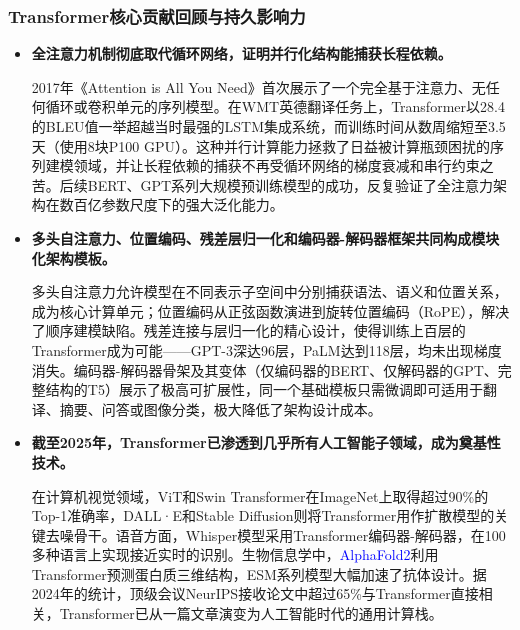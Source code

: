 \documentclass[11pt]{beamer}
\begin{document}
\begin{frame}
\frametitle{Transformer核心贡献回顾与持久影响力}

\begin{itemize}
  \item \textbf{全注意力机制彻底取代循环网络，证明并行化结构能捕获长程依赖。}
  
  2017年《Attention is All You Need》首次展示了一个完全基于注意力、无任何循环或卷积单元的序列模型。在WMT英德翻译任务上，Transformer以28.4的BLEU值一举超越当时最强的LSTM集成系统，而训练时间从数周缩短至3.5天（使用8块P100 GPU）。这种\alert{并行计算}能力拯救了日益被计算瓶颈困扰的序列建模领域，并让长程依赖的捕获不再受循环网络的梯度衰减和串行约束之苦。后续BERT、GPT系列大规模预训练模型的成功，反复验证了全注意力架构在数百亿参数尺度下的强大泛化能力。

  \item \textbf{多头自注意力、位置编码、残差层归一化和编码器-解码器框架共同构成模块化架构模板。}
  
  多头自注意力允许模型在不同表示子空间中分别捕获语法、语义和位置关系，成为\alert{核心计算单元}；位置编码从正弦函数演进到旋转位置编码（RoPE），解决了顺序建模缺陷。残差连接与层归一化的精心设计，使得训练上百层的Transformer成为可能——GPT-3深达96层，PaLM达到118层，均未出现梯度消失。编码器-解码器骨架及其变体（仅编码器的BERT、仅解码器的GPT、完整结构的T5）展示了极高\alert{可扩展性}，同一个基础模板只需微调即可适用于翻译、摘要、问答或图像分类，极大降低了架构设计成本。

  \item \textbf{截至2025年，Transformer已渗透到几乎所有人工智能子领域，成为奠基性技术。}
  
  在计算机视觉领域，ViT和Swin Transformer在ImageNet上取得超过90\%的Top-1准确率，DALL·E和Stable Diffusion则将Transformer用作扩散模型的关键去噪骨干。语音方面，Whisper模型采用Transformer编码器-解码器，在100多种语言上实现接近实时的识别。生物信息学中，\textcolor{blue}{AlphaFold2}利用Transformer预测蛋白质三维结构，ESM系列模型大幅加速了抗体设计。据2024年的统计，顶级会议NeurIPS接收论文中超过65\%与Transformer直接相关，Transformer已从一篇文章演变为人工智能时代的通用计算栈。
\end{itemize}
\end{frame}
\end{document}
